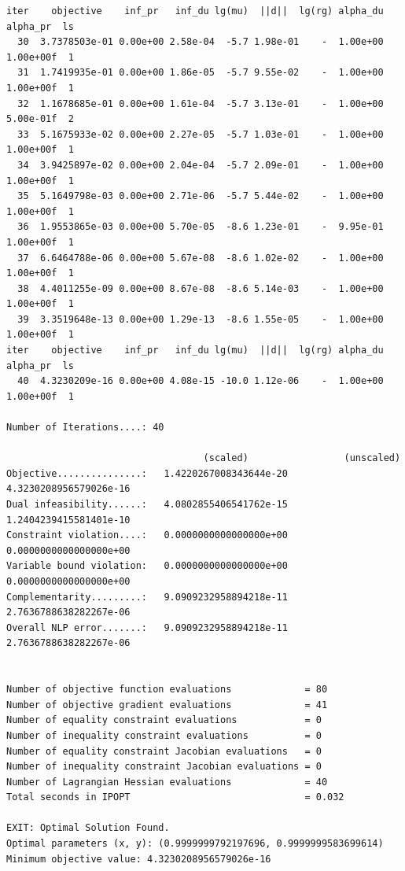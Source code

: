 \begin{verbatim}
iter    objective    inf_pr   inf_du lg(mu)  ||d||  lg(rg) alpha_du alpha_pr  ls
  30  3.7378503e-01 0.00e+00 2.58e-04  -5.7 1.98e-01    -  1.00e+00 1.00e+00f  1
  31  1.7419935e-01 0.00e+00 1.86e-05  -5.7 9.55e-02    -  1.00e+00 1.00e+00f  1
  32  1.1678685e-01 0.00e+00 1.61e-04  -5.7 3.13e-01    -  1.00e+00 5.00e-01f  2
  33  5.1675933e-02 0.00e+00 2.27e-05  -5.7 1.03e-01    -  1.00e+00 1.00e+00f  1
  34  3.9425897e-02 0.00e+00 2.04e-04  -5.7 2.09e-01    -  1.00e+00 1.00e+00f  1
  35  5.1649798e-03 0.00e+00 2.71e-06  -5.7 5.44e-02    -  1.00e+00 1.00e+00f  1
  36  1.9553865e-03 0.00e+00 5.70e-05  -8.6 1.23e-01    -  9.95e-01 1.00e+00f  1
  37  6.6464788e-06 0.00e+00 5.67e-08  -8.6 1.02e-02    -  1.00e+00 1.00e+00f  1
  38  4.4011255e-09 0.00e+00 8.67e-08  -8.6 5.14e-03    -  1.00e+00 1.00e+00f  1
  39  3.3519648e-13 0.00e+00 1.29e-13  -8.6 1.55e-05    -  1.00e+00 1.00e+00f  1
iter    objective    inf_pr   inf_du lg(mu)  ||d||  lg(rg) alpha_du alpha_pr  ls
  40  4.3230209e-16 0.00e+00 4.08e-15 -10.0 1.12e-06    -  1.00e+00 1.00e+00f  1

Number of Iterations....: 40

                                   (scaled)                 (unscaled)
Objective...............:   1.4220267008343644e-20    4.3230208956579026e-16
Dual infeasibility......:   4.0802855406541762e-15    1.2404239415581401e-10
Constraint violation....:   0.0000000000000000e+00    0.0000000000000000e+00
Variable bound violation:   0.0000000000000000e+00    0.0000000000000000e+00
Complementarity.........:   9.0909232958894218e-11    2.7636788638282267e-06
Overall NLP error.......:   9.0909232958894218e-11    2.7636788638282267e-06


Number of objective function evaluations             = 80
Number of objective gradient evaluations             = 41
Number of equality constraint evaluations            = 0
Number of inequality constraint evaluations          = 0
Number of equality constraint Jacobian evaluations   = 0
Number of inequality constraint Jacobian evaluations = 0
Number of Lagrangian Hessian evaluations             = 40
Total seconds in IPOPT                               = 0.032

EXIT: Optimal Solution Found.
Optimal parameters (x, y): (0.9999999792197696, 0.9999999583699614)
Minimum objective value: 4.3230208956579026e-16
\end{verbatim}

\Qed
\bigskip

